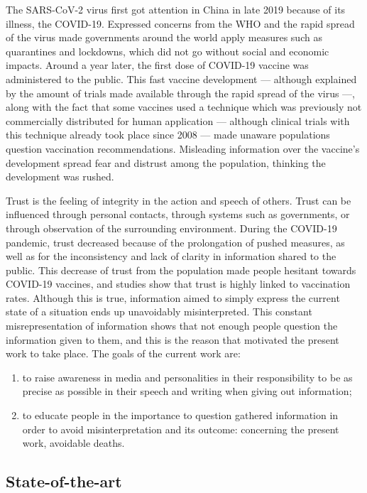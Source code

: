 The SARS-CoV-2 virus first got attention in China in late 2019 because of its illness, the COVID-19. Expressed concerns from the WHO and the rapid spread of the virus made governments around the world apply measures such as quarantines and lockdowns, which did not go without social and economic impacts.
Around a year later, the first dose of COVID-19 vaccine was administered to the public. This fast vaccine development --- although explained by the amount of trials made available through the rapid spread of the virus ---, along with the fact that some vaccines used a technique which was previously not commercially distributed for human application --- although clinical trials with this technique already took place since 2008 --- made unaware populations question vaccination recommendations. Misleading information over the vaccine's development spread fear and distrust among the population, thinking the development was rushed.

Trust is the feeling of integrity in the action and speech of others. Trust can be influenced through personal contacts, through systems such as governments, or through observation of the surrounding environment.
During the COVID-19 pandemic, trust decreased because of the prolongation of pushed measures, as well as for the inconsistency and lack of clarity in information shared to the public.
This decrease of trust from the population made people hesitant towards COVID-19 vaccines, and studies show that trust is highly linked to vaccination rates. Although this is true, information aimed to simply express the current state of a situation ends up unavoidably misinterpreted.
This constant misrepresentation of information shows that not enough people question the information given to them, and this is the reason that motivated the present work to take place.
The goals of the current work are:
\begin{enumerate}
    \item to raise awareness in media and personalities in their responsibility to be as precise as possible in their speech and writing when giving out information;
    \item to educate people in the importance to question gathered information in order to avoid misinterpretation and its outcome: concerning the present work, avoidable deaths.
\end{enumerate}

\subsection{State-of-the-art}

